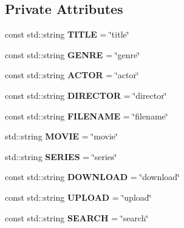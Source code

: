 \subsection*{Private Attributes}
\begin{DoxyCompactItemize}
\item 
\mbox{\label{classCli_a6b39501d775b2719cdacd6937507906a}} 
const std\+::string {\bfseries T\+I\+T\+LE} = \char`\"{}title\char`\"{}
\item 
\mbox{\label{classCli_ae49ac3e6fb12dfa20c41ca189cbcd863}} 
const std\+::string {\bfseries G\+E\+N\+RE} = \char`\"{}genre\char`\"{}
\item 
\mbox{\label{classCli_af1bfe00ff8a3f8415e74b39970007f1b}} 
const std\+::string {\bfseries A\+C\+T\+OR} = \char`\"{}actor\char`\"{}
\item 
\mbox{\label{classCli_ae1510a4c9ae1696862bf6362eddfdb63}} 
const std\+::string {\bfseries D\+I\+R\+E\+C\+T\+OR} = \char`\"{}director\char`\"{}
\item 
\mbox{\label{classCli_a25d22c371e6d1a701a375dd77b98a839}} 
const std\+::string {\bfseries F\+I\+L\+E\+N\+A\+ME} = \char`\"{}filename\char`\"{}
\item 
\mbox{\label{classCli_a74a219ff6c475389cbcffaeaad0f0315}} 
std\+::string {\bfseries M\+O\+V\+IE} = \char`\"{}movie\char`\"{}
\item 
\mbox{\label{classCli_a9e046dc850ddd6b5ee7da84655df7ad6}} 
std\+::string {\bfseries S\+E\+R\+I\+ES} = \char`\"{}series\char`\"{}
\item 
\mbox{\label{classCli_a45bb315b7351264e545e257ad09adbe8}} 
const std\+::string {\bfseries D\+O\+W\+N\+L\+O\+AD} = \char`\"{}download\char`\"{}
\item 
\mbox{\label{classCli_ad97f44e157d1e1919f24a51f503b8ad6}} 
const std\+::string {\bfseries U\+P\+L\+O\+AD} = \char`\"{}upload\char`\"{}
\item 
\mbox{\label{classCli_a6689cd38c78d1d3f06da4fc036d5a405}} 
const std\+::string {\bfseries S\+E\+A\+R\+CH} = \char`\"{}search\char`\"{}

\end{DoxyCompactItemize}
